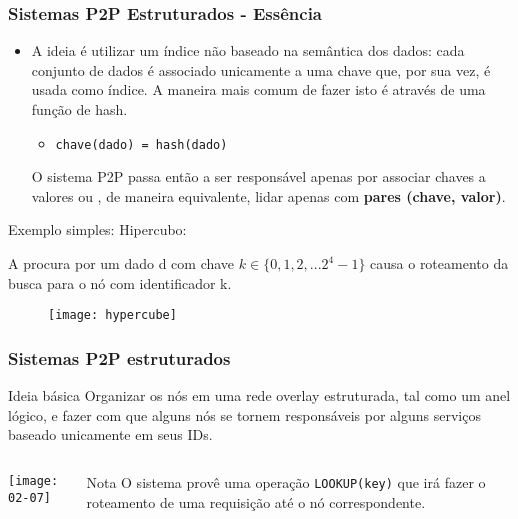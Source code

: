 \documentclass[Ligatures=TeX,table,brazil,svgnames,usetotalslideindicator,compress,10pt]{beamer}
\begin{document}
\begin{frame}
  \frametitle{Sistemas P2P Estruturados - Essência}

  \begin{itemize}
  \item A ideia é utilizar um índice \alert{não baseado na semântica dos
    dados}: cada conjunto de dados é associado unicamente a uma chave
    que, por sua vez, é usada como índice. A maneira mais comum de
    fazer isto é através de uma \alert{função de hash}.
    \begin{itemize}
    \item  \texttt{chave(dado) = hash(dado)}
    \end{itemize}
    O sistema P2P passa então a ser responsável apenas por associar
    chaves a valores ou , de maneira equivalente, lidar apenas com
    \textbf{pares (chave, valor)}.
  \end{itemize}

  \alert{Exemplo simples: Hipercubo:}

  A procura por um dado d com \alert{chave}
   $k \in \{0,1,2,...2^4-1\}$ causa o roteamento da busca para o nó
   com \alert{identificador} k.

  \vspace{-3em}
  \begin{figure}
  \centering
  \texttt{[image: hypercube]}
  \end{figure}
\end{frame}

\begin{frame}
  \frametitle{Sistemas P2P estruturados}

  \begin{block}{Ideia básica}
    Organizar os nós em uma \alert{rede overlay} estruturada, tal como um anel lógico, e fazer com que alguns nós se tornem responsáveis por alguns serviços baseado unicamente em seus IDs.
  \end{block}

  \begin{columns}

    \begin{column}{0.5\textwidth}
      \texttt{[image: 02-07]}
    \end{column}

    \begin{column}{0.5\textwidth}

      \begin{block}{Nota}
        O sistema provê uma operação \alert{\verb~LOOKUP(key)~} que irá fazer o roteamento de uma requisição até o nó correspondente.
      \end{block}
    \end{column}
  \end{columns}
\end{frame}
\end{document}
